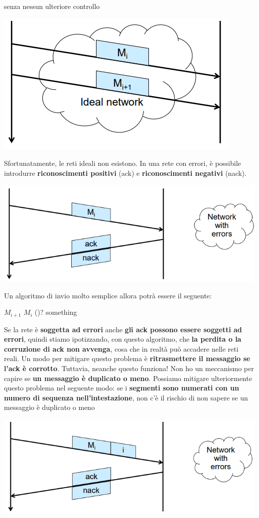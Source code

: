 \documentclass[12pt]{article}
\begin{document}
senza nessun ulteriore controllo
\begin{center}
    \includegraphics[width = 0.60\linewidth]{Images/46.png}
\end{center}
Sfortunatamente, le reti ideali non esistono. In una rete con errori, è possibile introdurre \textbf{riconoscimenti positivi} (ack) e \textbf{riconoscimenti negativi} (nack).
\begin{center}
    \includegraphics[width = 0.80\linewidth]{Images/47.png}
\end{center}
Un algoritmo di invio molto semplice allora potrà essere il seguente: \newline
\begin{algorithm}[H]
\DontPrintSemicolon
{} {
    $M_{i+1}$
} {
     {
        $M_i$
    }
    \If(){?} {
        something
    }
}
\end{algorithm}
\noindent
Se la rete è \textbf{soggetta ad errori} anche \textbf{gli ack possono essere soggetti ad errori}, quindi stiamo ipotizzando, con questo algoritmo, che \textbf{la perdita o la corruzione di ack non avvenga}, cosa
che in realtà può accadere nelle reti reali. Un modo per mitigare questo problema è \textbf{ritrasmettere il messaggio se l'ack è corrotto}.
Tuttavia, neanche questo funziona! Non ho un meccanismo per capire se \textbf{un messaggio è duplicato o meno}. Possiamo mitigare ulteriormente questo problema nel seguente modo:
se i \textbf{segmenti sono numerati con un numero di sequenza nell'intestazione}, non c'è il rischio di non sapere se un messaggio è duplicato o meno
\begin{center}
    \includegraphics[width = 0.80\linewidth]{Images/48.png}
\end{center}
\end{document}
